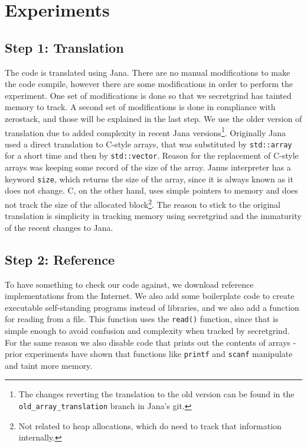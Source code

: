 \documentclass[a4paper,10pt,openright]{memoir}
\newcommand{\code}[1]{\texttt{#1}}
\begin{document}
\section{Experiments}

\subsection{Step 1: Translation}

The code is translated using Jana. There are no manual modifications to 
make the code compile, however there are some modifications in order to 
perform the experiment. One set of modifications is done so that we 
secretgrind has tainted memory to track. A second set of modifications 
is done in compliance with zerostack, and those will be explained in 
the last step. We use the older version of translation due to added 
complexity in recent Jana versions\footnote{The changes reverting the 
translation to the old version can be found in the 
\code{old\_array\_translation} branch in Jana's git.}. Originally Jana 
used a direct translation to C-style arrays, that was substituted by 
\code{std::array} for a short time and then by \code{std::vector}. 
Reason for the replacement of C-style arrays was keeping some record of 
the size of the array. Janus interpreter has a keyword \code{size}, 
which returns the size of the array, since it is always known as it 
does not change. C, on the other hand, uses simple pointers to memory 
and does not track the size of the allocated block\footnote{Not related 
to heap allocations, which do need to track that information 
internally.}. The reason to stick to the original translation is 
simplicity in tracking memory using secretgrind and the immaturity of 
the recent changes to Jana.

\subsection{Step 2: Reference}

To have something to check our code against, we download reference 
implementations from the Internet. We also add some boilerplate code to 
create executable self-standing programs instead of libraries, and we 
also add a function for reading from a file. This function uses the 
\code{read()} function, since that is simple enough to avoid confusion 
and complexity when tracked by secretgrind. For the same reason 
we also disable code that prints out the contents of arrays - prior 
experiments have shown that functions like \code{printf} and \code{scanf} manipulate and 
taint more memory.
\end{document}

